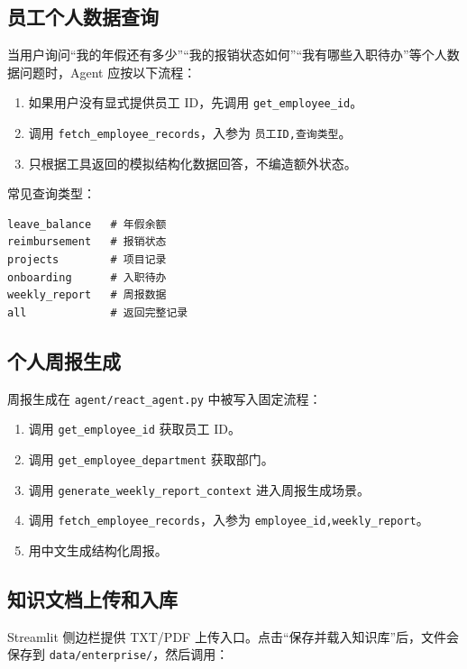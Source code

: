 \documentclass[UTF8,zihao=-4]{ctexart}
\begin{document}
\subsection{员工个人数据查询}

当用户询问“我的年假还有多少”“我的报销状态如何”“我有哪些入职待办”等个人数据问题时，Agent 应按以下流程：

\begin{enumerate}
\item 如果用户没有显式提供员工 ID，先调用 \texttt{get\_employee\_id}。
\item 调用 \texttt{fetch\_employee\_records}，入参为 \texttt{员工ID,查询类型}。
\item 只根据工具返回的模拟结构化数据回答，不编造额外状态。
\end{enumerate}

常见查询类型：

\begin{Verbatim}[breaklines=true,breakanywhere=true,fontsize=\small]
leave_balance   # 年假余额
reimbursement   # 报销状态
projects        # 项目记录
onboarding      # 入职待办
weekly_report   # 周报数据
all             # 返回完整记录
\end{Verbatim}

\subsection{个人周报生成}

周报生成在 \texttt{agent/react\_agent.py} 中被写入固定流程：

\begin{enumerate}
\item 调用 \texttt{get\_employee\_id} 获取员工 ID。
\item 调用 \texttt{get\_employee\_department} 获取部门。
\item 调用 \texttt{generate\_weekly\_report\_context} 进入周报生成场景。
\item 调用 \texttt{fetch\_employee\_records}，入参为 \texttt{employee\_id,weekly\_report}。
\item 用中文生成结构化周报。
\end{enumerate}

\subsection{知识文档上传和入库}

Streamlit 侧边栏提供 TXT/PDF 上传入口。点击“保存并载入知识库”后，文件会保存到 \texttt{data/enterprise/}，然后调用：
\end{document}
